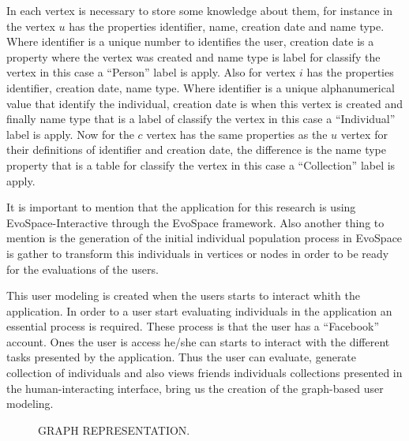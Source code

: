 In each vertex is necessary to store some knowledge about them, for instance in
the vertex $u$ has the properties identifier, name, creation date and name type.
Where identifier is a unique number to identifies the user, creation date is a
property where the vertex was created and name type is label for classify the
vertex in this case a “Person” label is apply. Also for vertex $i$ has the
properties identifier,  creation date, name type. Where identifier is a unique
alphanumerical value  that identify the individual, creation date is when this
vertex is created and finally name type that is a label of classify the vertex
in this case a “Individual” label is apply. Now for the  $c$ vertex has the same
properties as the $u$ vertex for their definitions of identifier and creation
date, the difference is the name type property that is a table for classify the
vertex in this case a “Collection” label is apply.

It is important to mention that the application for this research is using
EvoSpace-Interactive through the EvoSpace framework. Also another thing to
mention  is the generation of the initial individual population process in
EvoSpace is gather to transform this individuals in vertices or nodes in order
to  be ready for the evaluations of the users.
 
This user modeling is created when the users starts to interact whith the
application. In order to a user start evaluating individuals  in the application
an essential process is required. These process is that the user has a
“Facebook” account. Ones the user is access he/she can starts to interact with
the different tasks presented by the application. Thus the user can evaluate,
generate collection of individuals and also views friends individuals
collections presented in the human-interacting interface, bring us the creation
of the graph-based user modeling.


\begin{figure}
\captionsetup{justification=centering,margin=2cm}
\centering
\setlength\fboxsep{0pt}
\setlength\fboxrule{0.7pt}
\caption{GRAPH REPRESENTATION.}
\label{fig:graph}       
\end{figure}


